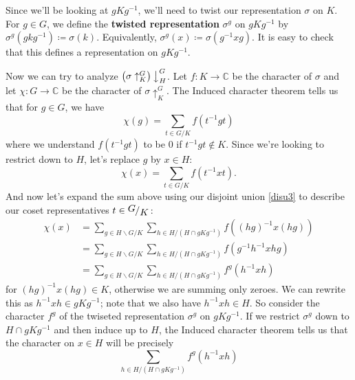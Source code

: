 \documentclass[12pt]{article}
\newcommand{\cx}{\mathbb{C}}
\newcommand\inv[1]{#1^{-1}}
\newcommand\paren[1]{\left( #1 \right)}
\newcommand{\quotient}[2]{{\makebox[\width-2.3pt][l]{\raisebox{.2em}{$#1$}}\left/\raisebox{-.2em}{$#2$}\right.}}
\theoremstyle{definition}
\begin{document}
Since we'll be looking at $gK\inv{g}$, we'll need to twist our representation $\sigma$ on $K$. For $g \in G$, we define the \textbf{twisted representation} $\sigma^g$ on $gK\inv{g}$ by $\sigma^g \paren{gk\inv{g}} \coloneqq  \sigma(k)$. Equivalently, $\sigma^g(x) \coloneqq  \sigma \paren{\inv{g}xg}$. It is easy to check that this defines a representation on $gK\inv{g}$.

Now we can try to analyze $\paren{ \sigma \uparrow_K^G }\big\downarrow^G_H$. Let $f : K \to \cx$ be the character of $\sigma$ and let $\chi : G \to \cx$ be the character of $\sigma \uparrow_K^G$. The Induced character theorem tells us that for $g \in G$, we have 
\begin{equation}
    \chi(g) = \sum\limits_{t \in G/K} f \paren{ \inv{t}gt }
\end{equation}
where we understand $f \paren{ \inv{t}gt }$ to be $0$ if $\inv{t}gt \notin K$. Since we're looking to restrict down to $H$, let's replace $g$ by $x \in H$:
\begin{equation}
    \chi(x) = \sum\limits_{t \in G/K} f \paren{ \inv{t}xt }.
\end{equation}
And now let's expand the sum above using our disjoint union \eqref{disu3} to describe our coset representatives $t \in \quotient{G}{K}$:
\begin{equation}
    \begin{split}
        \chi(x) & = \sum\limits_{g \in H \backslash G / K} \sum\limits_{h \in H / \paren{ H \cap gK\inv{g} }} f \paren{ \inv{(hg)} x (hg) } \\
        & = \sum\limits_{g \in H \backslash G / K} \sum\limits_{h \in H / \paren{ H \cap gK\inv{g} }} f \paren{ \inv{g} \inv{h} x h g } \\
        & = \sum\limits_{g \in H \backslash G / K} \sum\limits_{h \in H / \paren{ H \cap gK\inv{g} }} f^g \paren{ \inv{h}xh }
    \end{split}
\end{equation}
for $\inv{(hg)}x(hg) \in K$, otherwise we are summing only zeroes. We can rewrite this as $\inv{h}xh \in gK\inv{g}$; note that we also have $\inv{h}xh \in H$. So consider the character $f^g$ of the twiseted representation $\sigma^g$ on $gK\inv{g}$. If we restrict $\sigma^g$ down to $H \cap gK\inv{g}$ and then induce up to $H$, the Induced character theorem tells us that the character on $x \in H$ will be precisely
\begin{equation}
    \sum\limits_{h \in H / \paren{ H \cap gK\inv{g} } } f^g \paren{ \inv{h}xh }
\end{equation}
\end{document}

